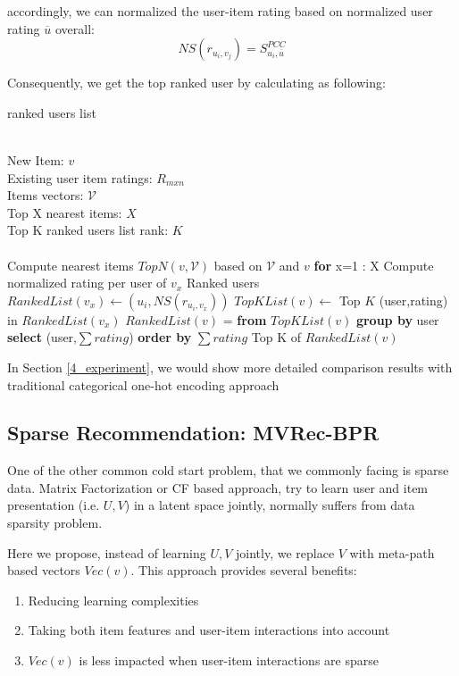 accordingly, we can normalized the user-item rating based on normalized user rating $\overline{u}$ overall:
\begin{equation}\label{pcc}
    NS(r_{u_i,v_j}) =  S_{u_i,\overline{u}}^{PCC}
\end{equation}

Consequently, we get the top ranked user by calculating as following:

\begin{algorithm}
    \caption{ranked users list}
    \begin{algorithmic}[1] 
    \REQUIRE~~\\ %
    New Item: $v$\\
    Existing user item ratings: ${R_{mxn}}$\\
    Items vectors: $\mathcal{V}$\\
    Top X nearest items: $X$\\
    Top K ranked users list rank: $K$\\
    \ENSURE~~\\ %
    \STATE Compute nearest items $TopN(v,\mathcal{V})$ based on $\mathcal{V}$ and $v$
    \STATE \textbf{for} x=1 : X
    \STATE \quad Compute normalized rating per user of $v_x$
    \STATE \quad Ranked users $RankedList(v_x) \leftarrow (u_i, NS(r_{u_i,v_x}))$
    \STATE \quad $TopKList(v) \leftarrow$ Top $K$ (user,rating) in $RankedList(v_x)$
    \STATE $RankedList(v)$ = \textbf{from} $TopKList(v)$ \textbf{group by} user \textbf{select} (user,$\sum{rating}$) \textbf{order by} $\sum{rating}$
    \RETURN Top K of $RankedList(v)$
    \end{algorithmic}\label{alg:1}
\end{algorithm}

In Section \ref{4_experiment}, we would show more detailed comparison results with traditional categorical one-hot encoding approach

\subsection{Sparse Recommendation: MVRec-BPR}\label{3BPR}
One of the other common cold start problem, that we commonly facing is sparse data. Matrix Factorization or CF based approach, try to learn user and item presentation (i.e. $U, V$) in a latent space jointly, normally suffers from data sparsity problem.


Here we propose, instead of learning $U, V$ jointly, we replace $V$ with meta-path based vectors $Vec(v)$. This approach provides several benefits:
\begin{enumerate}
        \item Reducing learning complexities
        \item Taking both item features and user-item interactions into account
        \item $Vec(v)$ is less impacted when user-item interactions are sparse 
\end{enumerate}

